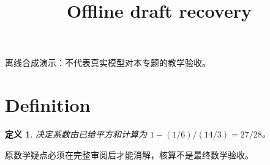 \documentclass[UTF8,fontset=fandol,11pt]{ctexart}
\title{Offline draft recovery}
\date{}
\newtheorem{definition}{定义}[section]
\begin{document}
\maketitle
\par\noindent 离线合成演示：不代表真实模型对本专题的教学验收。\par
\section{Definition}\label{sec:S01}
\begin{definition}
决定系数由已给平方和计算为 $1-(1/6)/(14/3)=27/28$。
\end{definition}
原数学疑点必须在完整审阅后才能消解，核算不是最终数学验收。\par
\end{document}
